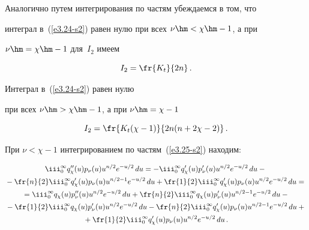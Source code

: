 Аналогично путем интегрирования по частям убеждаемся в том, что

интеграл в~(\ref{e3.24-s2}) равен нулю при всех $\nu\hm<\chi \hm-1$, а при

$\nu\hm=\chi \hm-1$ для~$I_2$ имеем



\noindent

\begin{equation*}

I_2 = \fr{K_t}{2n}\,.


\end{equation*}

Интеграл в~(\ref{e3.24-s2}) равен нулю

при всех $\nu\hm>\chi\hm-1$, а при $\nu\hm= \chi-1$



\noindent

\begin{equation*}

I_2 = \fr{K_t(\chi-1)}{2n (n+2\chi -2)}\,.


\end{equation*}



При $\nu<\chi -1$ интегрированием по частям~(\ref{e3.25-s2}) находим:



\noindent

   \begin{multline*}

   \iii_{0}^\infty q_\chi'' (u) p_\nu (u) u^{n/2} e^{-u/2}\, du=

    -\iii_{0}^\infty q_\chi' (u) p_\nu' (u) u^{n/2} e^{-u/2}\, du-{}\\

{}-\fr{n}{2} \iii_{0}^\infty q_\chi' (u) p_\nu (u)

    u^{n/2-1} e^{-u/2} \,du+\fr{1}{2}

    \iii_{0}^\infty q_\chi' (u) p_\nu (u) u^{n/2} e^{-u/2}\, du={}\\

{}=\iii_{0}^\infty q_\chi (u) p_\nu ''(u) u^{n/2} e^{-u/2}\, du+ 

\fr{n}{2} \iii_{0}^\infty q_\chi (u) p_\nu' (u)     u^{n/2-1}     e^{-u/2} \, du-{}\\

{}-\fr{1}{2} \iii_{0}^\infty q_\chi (u) p_\nu' (u) u^{n/2} e^{-u/2}\, du- 

\fr{n}{2} \iii_{0}^\infty q_\chi' (u) p_\nu (u) u^{n/2-1} e^{-u/2}\, du+{}\\

{}+ \fr{1}{2} \iii_{0}^\infty q_\chi' (u) p_\nu (u) u^{n/2} e^{-u/2}\, du\,.

\end{multline*}

